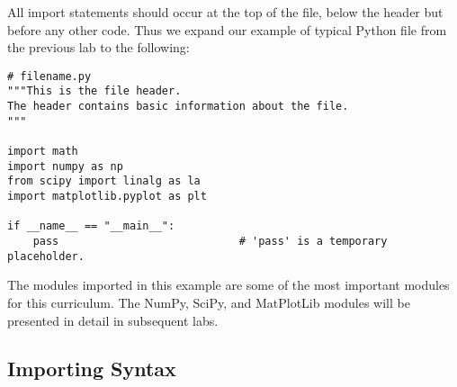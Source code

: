 All import statements should occur at the top of the file, below the header but before any other code.
Thus we expand our example of typical Python file from the previous lab to the following:

\begin{lstlisting}
# filename.py
"""This is the file header.
The header contains basic information about the file.
"""

import math
import numpy as np
from scipy import linalg as la
import matplotlib.pyplot as plt

if __name__ == "__main__":
    pass                            # 'pass' is a temporary placeholder.
\end{lstlisting}

\begin{info}
The modules imported in this example are some of the most important modules for this curriculum.
The NumPy, SciPy, and MatPlotLib modules will be presented in detail in subsequent labs.
\end{info}

\subsection*{Importing Syntax} %


